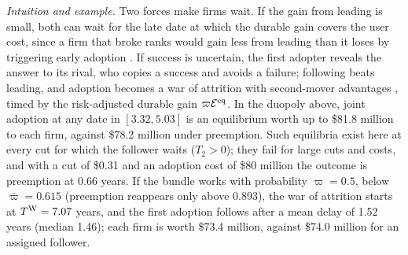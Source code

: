 \noindent\emph{Intuition and example.} Two forces make firms wait. If the gain from leading is small, both can wait for the late date at which the durable gain covers the user cost, since a firm that broke ranks would gain less from leading than it loses by triggering early adoption \citep{fudenberg1985preemption}. If success is uncertain, the first adopter reveals the answer to its rival, who copies a success and avoids a failure; following beats leading, and adoption becomes a war of attrition \citep{hendricks1988war} with second-mover advantages \citep{hoppe2000second}, timed by the risk-adjusted durable gain $\varpi\mathcal E^{\rm eq}$. In the duopoly above, joint adoption at any date in $[3.32,5.03]$ is an equilibrium worth up to \$81.8 million to each firm, against \$78.2 million under preemption. Such equilibria exist here at every cut for which the follower waits ($T_2>0$); they fail for large cuts and costs, and with a cut of \$0.31 and an adoption cost of \$80 million the outcome is preemption at 0.66 years. If the bundle works with probability $\varpi=0.5$, below $\bar\varpi=0.615$ (preemption reappears only above 0.893), the war of attrition starts at $T^{\rm W}=7.07$ years, and the first adoption follows after a mean delay of 1.52 years (median 1.46); each firm is worth \$73.4 million, against \$74.0 million for an assigned follower.

